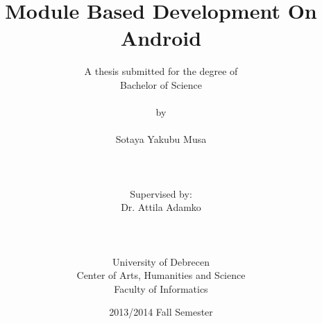 \title{\Huge \bf Module Based Development On Android}

\author{A thesis submitted for the degree of\\
Bachelor of Science \\ \\  
by \\ \\ 
Sotaya Yakubu Musa \\ \\ \\ \\ 
Supervised by: \\
Dr. Attila Adamko \\ \\ \\ \\ 
University of Debrecen \\
Center of Arts, Humanities and Science\\
Faculty of Informatics}

\date{2013/2014 Fall Semester}							%

\maketitle

